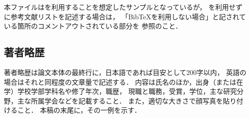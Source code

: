 本ファイルは\BibTeX を利用することを想定したサンプルとなっているが，
\BibTeX を利用せずに参考文献リストを記述する場合は，
「BibTeXを利用しない場合」と記されている箇所のコメントアウトされている部分を
参照のこと．

\subsection{著者略歴}

著者略歴は論文本体の最終行に，日本語であれば目安として200字以内，
英語の場合はそれと同程度の文章量で記述する．
内容は氏名のほか，出身（または在学）学校学部学科名や修了年次，職歴，
現職と職務，受賞，学位，主な研究分野，主な所属学会などを記載すること．
また，適切な大きさで顔写真を貼り付けること．
本稿の末尾に，その一例を示す．
